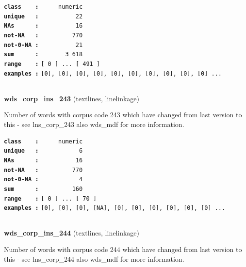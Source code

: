 \documentclass[]{article}
\begin{document}
\textbf{\texttt{class\ \ \ \ :}} \texttt{~~~~~numeric}\\
\textbf{\texttt{unique\ \ \ :}} \texttt{~~~~~~~~~~22}\\
\textbf{\texttt{NAs\ \ \ \ \ \ :}} \texttt{~~~~~~~~~~16}\\
\textbf{\texttt{not-NA\ \ \ :}} \texttt{~~~~~~~~~770}\\
\textbf{\texttt{not-0-NA\ :}} \texttt{~~~~~~~~~~21}\\
\textbf{\texttt{sum\ \ \ \ \ \ :}} \texttt{~~~~~~~3~618}\\
\textbf{\texttt{range\ \ \ \ :}}
\texttt{{[}\ 0\ {]}\ ...\ {[}\ 491\ {]}}\\
\textbf{\texttt{examples\ :}}
\texttt{{[}0{]},\ {[}0{]},\ {[}0{]},\ {[}0{]},\ {[}0{]},\ {[}0{]},\ {[}0{]},\ {[}0{]},\ {[}0{]},\ {[}0{]}\ ...}\\

~

\textbf{wds\_corp\_ins\_243} (textlines, linelinkage)

Number of words with corpus code 243 which have changed from last
version to this - see lns\_corp\_243 also wds\_mdf for more information.

\textbf{\texttt{class\ \ \ \ :}} \texttt{~~~~~numeric}\\
\textbf{\texttt{unique\ \ \ :}} \texttt{~~~~~~~~~~~6}\\
\textbf{\texttt{NAs\ \ \ \ \ \ :}} \texttt{~~~~~~~~~~16}\\
\textbf{\texttt{not-NA\ \ \ :}} \texttt{~~~~~~~~~770}\\
\textbf{\texttt{not-0-NA\ :}} \texttt{~~~~~~~~~~~4}\\
\textbf{\texttt{sum\ \ \ \ \ \ :}} \texttt{~~~~~~~~~160}\\
\textbf{\texttt{range\ \ \ \ :}}
\texttt{{[}\ 0\ {]}\ ...\ {[}\ 70\ {]}}\\
\textbf{\texttt{examples\ :}}
\texttt{{[}0{]},\ {[}0{]},\ {[}0{]},\ {[}NA{]},\ {[}0{]},\ {[}0{]},\ {[}0{]},\ {[}0{]},\ {[}0{]},\ {[}0{]}\ ...}\\

~

\textbf{wds\_corp\_ins\_244} (textlines, linelinkage)

Number of words with corpus code 244 which have changed from last
version to this - see lns\_corp\_244 also wds\_mdf for more information.
\end{document}
